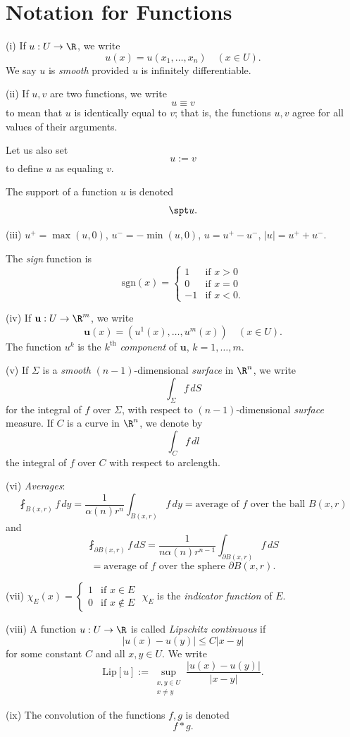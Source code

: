 \section{Notation for Functions}
\label{sec:notation-for-functions}

\begin{definition}
\label{def:function-notation-basic}
(i) If $u : U \to \R$, we write
$$u(x) = u(x_1, \ldots, x_n) \quad (x \in U).$$
We say $u$ is \textit{smooth} provided $u$ is infinitely differentiable.

(ii) If $u, v$ are two functions, we write
$$u \equiv v$$
to mean that $u$ is identically equal to $v$; that is, the functions $u, v$ agree for all values of their arguments.

Let us also set
$$u := v$$
to define $u$ as equaling $v$.

The support of a function $u$ is denoted
$$\spt u.$$

(iii) $u^+ = \max(u, 0)$, $u^- = -\min(u, 0)$, $u = u^+ - u^-$, $|u| = u^+ + u^-$.

The \textit{sign} function is
$$\text{sgn}(x) = \begin{cases} 1 & \text{if } x > 0 \\ 0 & \text{if } x = 0 \\ -1 & \text{if } x < 0. \end{cases}$$

(iv) If $\mathbf{u} : U \to \R^m$, we write
$$\mathbf{u}(x) = (u^1(x), \ldots, u^m(x)) \quad (x \in U).$$
The function $u^k$ is the $k^{\text{th}}$ \textit{component} of $\mathbf{u}$, $k = 1, \ldots, m$.

(v) If $\Sigma$ is a \textit{smooth} $(n-1)$-dimensional \textit{surface} in $\R^n$, we write
$$\int_\Sigma f \, dS$$
for the integral of $f$ over $\Sigma$, with respect to $(n-1)$-dimensional \textit{surface} measure. If $C$ is a curve in $\R^n$, we denote by
$$\int_C f \, dl$$
the integral of $f$ over $C$ with respect to arclength.

(vi) \textit{Averages}:
$$\fint_{B(x,r)} f \, dy = \frac{1}{\alpha(n)r^n} \int_{B(x,r)} f \, dy = \text{average of } f \text{ over the ball } B(x,r)$$
and
$$\fint_{\partial B(x,r)} f \, dS = \frac{1}{n\alpha(n)r^{n-1}} \int_{\partial B(x,r)} f \, dS$$
$$= \text{average of } f \text{ over the sphere } \partial B(x,r).$$

(vii) $\chi_E(x) = \begin{cases} 1 & \text{if } x \in E \\ 0 & \text{if } x \notin E \end{cases}$ $\chi_E$ is the \textit{indicator function} of $E$.

(viii) A function $u : U \to \R$ is called \textit{Lipschitz continuous} if
$$|u(x) - u(y)| \leq C|x - y|$$
for some constant $C$ and all $x, y \in U$. We write
$$\text{Lip}[u] := \sup_{\substack{x,y \in U \\ x \neq y}} \frac{|u(x) - u(y)|}{|x - y|}.$$

(ix) The convolution of the functions $f, g$ is denoted
$$f * g.$$
\end{definition}

